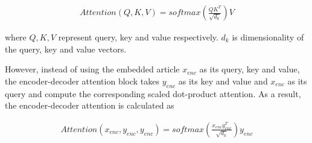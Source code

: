 \documentclass{article}
\begin{document}
\begin{align}
    Attention(Q,K,V) = softmax(\frac{QK^T}{\sqrt{d_k}})V
\end{align}

where $Q,K,V$ represent query, key and value respectively. $d_k$ is dimensionality of the query, key and value vectors.

However, instead of using the embedded article $x_{enc}$ as its query, key and value, the encoder-decoder attention block takes $y_{enc}$ as its key and value and $x_{enc}$ as its query and compute the corresponding scaled dot-product attention. As a result, the encoder-decoder attention is calculated as

\begin{align}
   Attention(x_{enc},y_{enc},y_{enc}) = softmax(\frac{x_{enc}y_{enc}^T}{\sqrt{d_k}})y_{enc}
\end{align}
\end{document}
